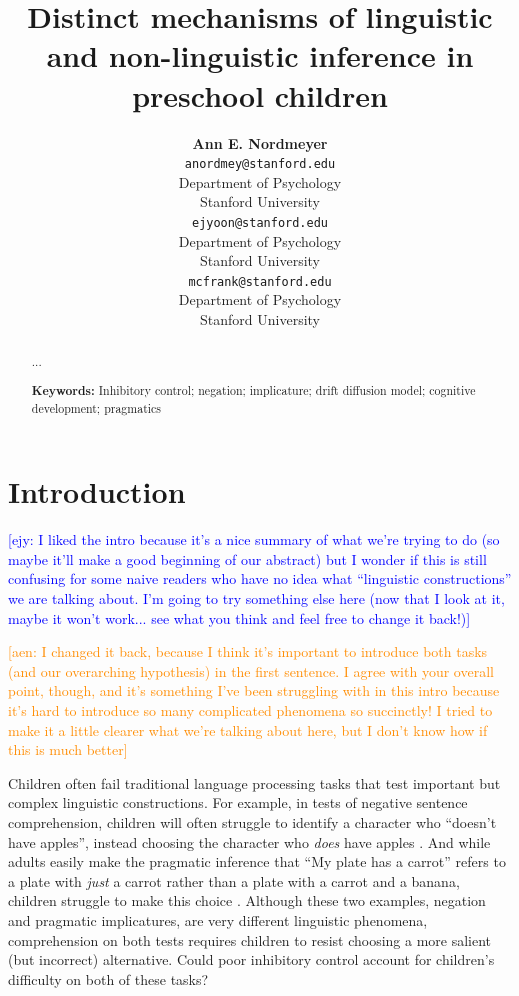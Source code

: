 \documentclass[10pt,letterpaper]{article}
\title{Distinct mechanisms of linguistic and non-linguistic inference in preschool children}
\author{{\large \bf Ann E. Nordmeyer} \\
  \texttt{anordmey@stanford.edu} \\
  Department of Psychology \\
  Stanford University
  \And {\large \bf Erica J. Yoon} \\
  \texttt{ejyoon@stanford.edu} \\
  Department of Psychology \\
  Stanford University
  \And {\large \bf Michael C. Frank} \\
  \texttt{mcfrank@stanford.edu} \\
  Department of Psychology \\
  Stanford University}
\newcommand{\ejy}[1]{\textcolor{Blue}{[ejy: #1]}}
\newcommand{\aen}[1]{\textcolor{DarkOrange}{[aen: #1]}}
\begin{document}
\maketitle


\begin{abstract}

...

\textbf{Keywords:} 
Inhibitory control; negation; implicature; drift diffusion model; cognitive development; pragmatics

\end{abstract}


\section{Introduction}


\ejy{I liked the intro because it's a nice summary of what we're trying to do (so maybe it'll make a good beginning of our abstract) but I wonder if this is still confusing for some naive readers who have no idea what ``linguistic constructions'' we are talking about. I'm going to try something else here (now that I look at it, maybe it won't work... see what you think and feel free to change it back!)}

\aen{I changed it back, because I think it's important to introduce both tasks (and our overarching hypothesis) in the first sentence.  I agree with your overall point, though, and it's something I've been struggling with in this intro because it's hard to introduce so many complicated phenomena so succinctly!  I tried to make it a little clearer what we're talking about here, but I don't know how if this is much better}

Children often fail traditional language processing tasks that test important but complex linguistic constructions.  For example, in tests of negative sentence comprehension, children will often struggle to identify a character who ``doesn't have apples'', instead choosing the character who \emph{does} have apples \cite{nordmeyer2014b}.  And while adults easily make the pragmatic inference that ``My plate has a carrot'' refers to a plate with \emph{just} a carrot rather than a plate with a carrot and a banana, children struggle to make this choice \cite{yoonchildren}.   Although these two examples, negation and pragmatic implicatures, are very different linguistic phenomena, comprehension on both tests requires children to resist choosing a more salient (but incorrect) alternative.  Could poor inhibitory control account for children's difficulty on both of these tasks? 
\end{document}
